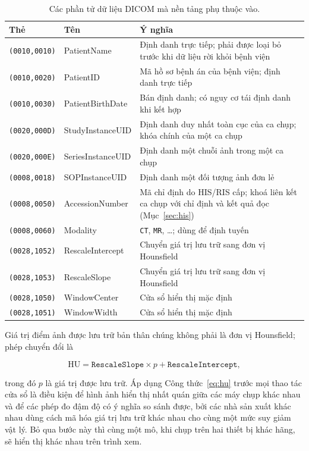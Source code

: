 \begin{table}[H]
\centering
\small
\begin{tabularx}{\textwidth}{@{}l l X@{}}
\toprule
\textbf{Thẻ} & \textbf{Tên} & \textbf{Ý nghĩa} \\
\midrule
\texttt{(0010,0010)} & PatientName & Định danh trực tiếp; phải được loại bỏ trước khi dữ liệu rời khỏi bệnh viện \\
\texttt{(0010,0020)} & PatientID & Mã hồ sơ bệnh án của bệnh viện; định danh trực tiếp \\
\texttt{(0010,0030)} & PatientBirthDate & Bán định danh; có nguy cơ tái định danh khi kết hợp \\
\texttt{(0020,000D)} & StudyInstanceUID & Định danh duy nhất toàn cục của ca chụp; khóa chính của một ca chụp \\
\texttt{(0020,000E)} & SeriesInstanceUID & Định danh một chuỗi ảnh trong một ca chụp \\
\texttt{(0008,0018)} & SOPInstanceUID & Định danh một đối tượng ảnh đơn lẻ \\
\texttt{(0008,0050)} & AccessionNumber & Mã chỉ định do HIS/RIS cấp; khoá liên kết ca chụp với chỉ định và kết quả đọc (Mục~\ref{sec:his}) \\
\texttt{(0008,0060)} & Modality & \texttt{CT}, \texttt{MR}, \ldots; dùng để định tuyến \\
\texttt{(0028,1052)} & RescaleIntercept & Chuyển giá trị lưu trữ sang đơn vị Hounsfield \\
\texttt{(0028,1053)} & RescaleSlope & Chuyển giá trị lưu trữ sang đơn vị Hounsfield \\
\texttt{(0028,1050)} & WindowCenter & Cửa sổ hiển thị mặc định \\
\texttt{(0028,1051)} & WindowWidth & Cửa sổ hiển thị mặc định \\
\bottomrule
\end{tabularx}
\caption{Các phần tử dữ liệu DICOM mà nền tảng phụ thuộc vào.}
\label{tab:tags}
\end{table}

Giá trị điểm ảnh được lưu trữ bản thân chúng không phải là đơn vị Hounsfield;
phép chuyển đổi là

\begin{equation}
    \mathrm{HU} = \mathtt{RescaleSlope} \times p + \mathtt{RescaleIntercept},
    \label{eq:hu}
\end{equation}

trong đó $p$ là giá trị được lưu trữ. Áp dụng Công thức~\ref{eq:hu} trước mọi
thao tác cửa sổ là điều kiện để hình ảnh hiển thị nhất quán giữa các máy chụp
khác nhau và để các phép đo đậm độ có ý nghĩa so sánh được, bởi các nhà sản
xuất khác nhau dùng cách mã hóa giá trị lưu trữ khác nhau cho cùng một mức suy
giảm vật lý. Bỏ qua bước này thì cùng một mô, khi chụp trên hai thiết bị khác
hãng, sẽ hiển thị khác nhau trên trình xem.

